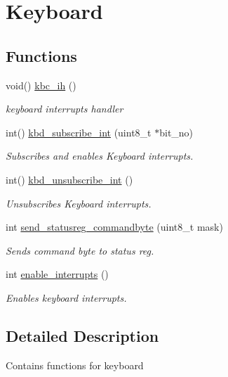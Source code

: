 \hypertarget{group__Keyboard}{}\section{Keyboard}
\label{group__Keyboard}
\subsection*{Functions}
\begin{DoxyCompactItemize}
\item 
void() \hyperlink{group__Keyboard_gaea970a154161a35f6894898a092ed70a}{kbc\+\_\+ih} ()
\begin{DoxyCompactList}\small\item\em keyboard interrupts handler \end{DoxyCompactList}\item 
int() \hyperlink{group__Keyboard_ga4ac9231a99a664d6a9f0b69767e0d707}{kbd\+\_\+subscribe\+\_\+int} (uint8\+\_\+t $\ast$bit\+\_\+no)
\begin{DoxyCompactList}\small\item\em Subscribes and enables Keyboard interrupts. \end{DoxyCompactList}\item 
int() \hyperlink{group__Keyboard_gaee0a7b54ee426fade9c780418d110fe0}{kbd\+\_\+unsubscribe\+\_\+int} ()
\begin{DoxyCompactList}\small\item\em Unsubscribes Keyboard interrupts. \end{DoxyCompactList}\item 
int \hyperlink{group__Keyboard_gade2f6cbc5a539bc152aca944b3cd5c43}{send\+\_\+statusreg\+\_\+commandbyte} (uint8\+\_\+t mask)
\begin{DoxyCompactList}\small\item\em Sends command byte to status reg. \end{DoxyCompactList}\item 
int \hyperlink{group__Keyboard_ga4909d2b8687b61065a2ce1d215135c3e}{enable\+\_\+interrupts} ()
\begin{DoxyCompactList}\small\item\em Enables keyboard interrupts. \end{DoxyCompactList}\end{DoxyCompactItemize}


\subsection{Detailed Description}
Contains functions for keyboard 

